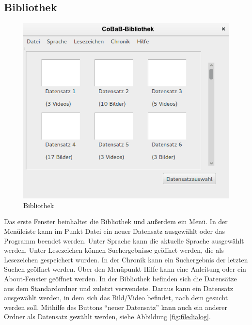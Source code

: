 \subsection{Bibliothek}
\begin{figure}[H]
\includegraphics[width=1\linewidth]{img/Bibliothek2}
\caption{Bibliothek}
\label{fig:bibliothek}
\end{figure}
Das erste Fenster beinhaltet die Bibliothek und außerdem ein Menü. In der Menüleiste kann im Punkt Datei ein neuer Datensatz ausgewählt oder das Programm beendet werden.  Unter Sprache kann die aktuelle Sprache ausgewählt werden. Unter Lesezeichen können Suchergebnisse geöffnet werden, die als Lesezeichen gespeichert wurden. In der Chronik kann ein Suchergebnis der letzten Suchen geöffnet werden. Über den Menüpunkt Hilfe kann eine Anleitung oder ein About-Fenster geöffnet werden.
In der Bibliothek befinden sich die Datensätze aus dem Standardordner und zuletzt verwendete. Daraus kann ein Datensatz ausgewählt werden, in dem sich das Bild/Video befindet, nach dem gesucht werden soll. Mithilfe des Buttons \enquote{neuer Datensatz} kann auch ein anderer Ordner als Datensatz gewählt werden, siehe Abbildung \ref{fig:filedialog}.

